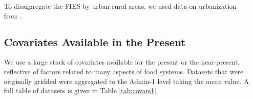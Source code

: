 \documentclass{article}
\begin{document}
To disaggregate the FIES by urban-rural areas, we used data on urbanization from \cite{Jiang2017}.

\subsection{Covariates Available in the Present}
We use a large stack of covariates available for the present or the near-present, reflective of factors related to many aspects of food systems.  Datasets that were originally gridded were aggregated to the Admin-1 level taking the mean value.  A full table of datasets is given in Table \ref{tab:covars1}.

\end{document}
